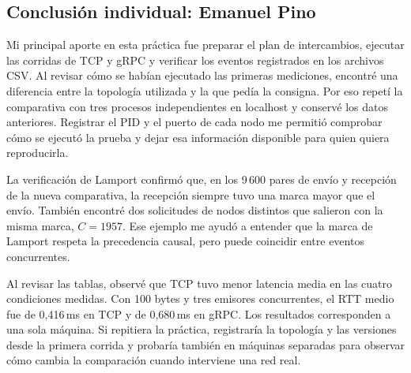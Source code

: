 \subsection{Conclusión individual: Emanuel Pino}

Mi principal aporte en esta práctica fue preparar el plan de intercambios, ejecutar las corridas de TCP y gRPC y verificar los eventos registrados en los archivos CSV. Al revisar cómo se habían ejecutado las primeras mediciones, encontré una diferencia entre la topología utilizada y la que pedía la consigna. Por eso repetí la comparativa con tres procesos independientes en localhost y conservé los datos anteriores. Registrar el PID y el puerto de cada nodo me permitió comprobar cómo se ejecutó la prueba y dejar esa información disponible para quien quiera reproducirla.

La verificación de Lamport confirmó que, en los 9\,600 pares de envío y recepción de la nueva comparativa, la recepción siempre tuvo una marca mayor que el envío. También encontré dos solicitudes de nodos distintos que salieron con la misma marca, \(C=1957\). Ese ejemplo me ayudó a entender que la marca de Lamport respeta la precedencia causal, pero puede coincidir entre eventos concurrentes.

Al revisar las tablas, observé que TCP tuvo menor latencia media en las cuatro condiciones medidas. Con 100 bytes y tres emisores concurrentes, el RTT medio fue de 0,416\,ms en TCP y de 0,680\,ms en gRPC. Los resultados corresponden a una sola máquina. Si repitiera la práctica, registraría la topología y las versiones desde la primera corrida y probaría también en máquinas separadas para observar cómo cambia la comparación cuando interviene una red real.
